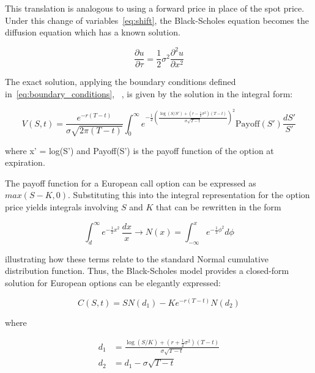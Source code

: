     This translation is analogous to using a forward price in place of the spot price.
    Under this change of variables~\ref{eq:shift},
    the Black-Scholes equation becomes the diffusion equation which has a known solution.

    \begin{equation}
        \frac{\partial u}{\partial \tau} = \frac{1}{2} \sigma^2 \frac{\partial^2 u}{\partial x^2}
        \label{eq:diffusion_eq}
    \end{equation}

    The exact solution, applying the boundary conditions defined in~\ref{eq:boundary_conditions},
    ~\cite{wilmott_paul_2007}, is given by the solution in the integral form:

    \begin{equation}
        V(S,t) =
            \frac{e^{-r(T-t)}}{\sigma \sqrt{2 \pi (T-t)}}
            \int_{0}^{\infty} e^{-\frac{1}{2}\left(
                 \frac{\log(S/S') + (r - \frac{1}{2}\sigma^2)(T-t)}{\sigma \sqrt{T-t}}
            \right)^2}
            \text{Payoff}(S') \frac{dS'}{S'}
        \label{eq:bs_solution_integral}
    \end{equation}

    where x' = log(S') and Payoff(S') is the payoff function of the option at expiration.

    The payoff function for a European call option can be expressed as $max(S - K, 0)$.
    Substituting this into the integral representation for the option price yields integrals involving $S$ and $K$
    that can be rewritten in the form

    \begin{equation}
        \int_{d}^{\infty} e^{-\tfrac{1}{2} x^2} \,\frac{dx}{x}
            \longrightarrow
            N(x) = \int_{-\infty}^{x} e^{-\tfrac{1}{2} \phi^2} d\phi
        \label{eq:form_integral}
    \end{equation}

    illustrating how these terms relate to the standard Normal cumulative distribution function.
    Thus, the Black-Scholes model provides a closed-form solution for European options can be elegantly expressed:

    \begin{equation}
        C(S,t) = S N(d_1) - K e^{-r(T-t)} N(d_2)
        \label{eq:bs_solution}
    \end{equation}

    where

    \begin{equation}
        \begin{aligned}
            d_1 &= \frac{\log(S/K) + (r + \tfrac{1}{2}\sigma^2)(T-t)}{\sigma \sqrt{T-t}} \\
            d_2 &= d_1 - \sigma \sqrt{T-t}
        \end{aligned}
        \label{eq:bs_d1_d2}
    \end{equation}

